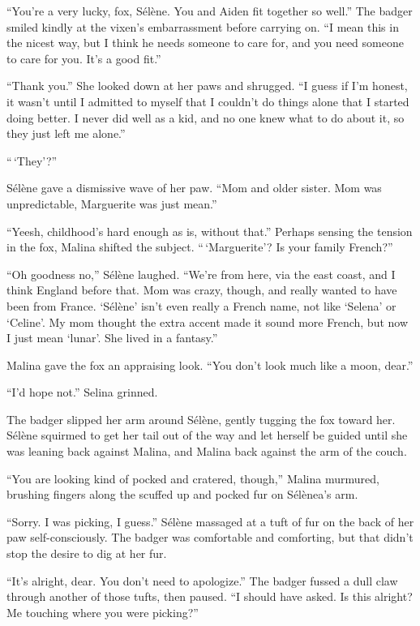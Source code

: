 ``You're a very lucky, fox, Sélène. You and Aiden fit together so well.'' The badger smiled kindly at the vixen's embarrassment before carrying on. ``I mean this in the nicest way, but I think he needs someone to care for, and you need someone to care for you. It's a good fit.''

``Thank you.'' She looked down at her paws and shrugged. ``I guess if I'm honest, it wasn't until I admitted to myself that I couldn't do things alone that I started doing better. I never did well as a kid, and no one knew what to do about it, so they just left me alone.''

``\,`They'?''

Sélène gave a dismissive wave of her paw. ``Mom and older sister. Mom was unpredictable, Marguerite was just mean.''

``Yeesh, childhood's hard enough as is, without that.'' Perhaps sensing the tension in the fox, Malina shifted the subject. ``\,`Marguerite'? Is your family French?''

``Oh goodness no,'' Sélène laughed. ``We're from here, via the east coast, and I think England before that. Mom was crazy, though, and really wanted to have been from France. `Sélène' isn't even really a French name, not like `Selena' or `Celine'. My mom thought the extra accent made it sound more French, but now I just mean `lunar'. She lived in a fantasy.''

Malina gave the fox an appraising look. ``You don't look much like a moon, dear.''

``I'd hope not.'' Selina grinned.

The badger slipped her arm around Sélène, gently tugging the fox toward her. Sélène squirmed to get her tail out of the way and let herself be guided until she was leaning back against Malina, and Malina back against the arm of the couch.

``You are looking kind of pocked and cratered, though,'' Malina murmured, brushing fingers along the scuffed up and pocked fur on Sélènea's arm.

``Sorry. I was picking, I guess.'' Sélène massaged at a tuft of fur on the back of her paw self-consciously. The badger was comfortable and comforting, but that didn't stop the desire to dig at her fur.

``It's alright, dear. You don't need to apologize.'' The badger fussed a dull claw through another of those tufts, then paused. ``I should have asked. Is this alright? Me touching where you were picking?''

